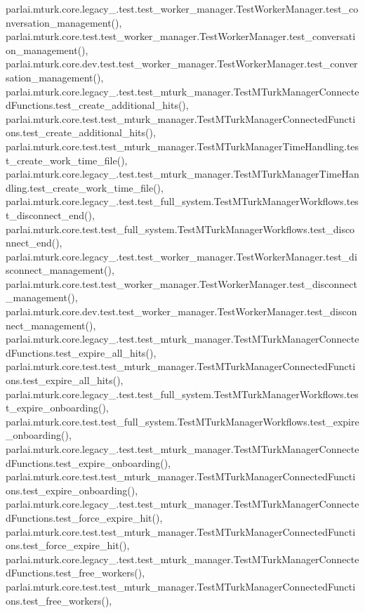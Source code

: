 parlai.\+mturk.\+core.\+legacy\+\_.\+test.\+test\+\_\+worker\+\_\+manager.\+Test\+Worker\+Manager.\+test\+\_\+conversation\+\_\+management(), parlai.\+mturk.\+core.\+test.\+test\+\_\+worker\+\_\+manager.\+Test\+Worker\+Manager.\+test\+\_\+conversation\+\_\+management(), parlai.\+mturk.\+core.\+dev.\+test.\+test\+\_\+worker\+\_\+manager.\+Test\+Worker\+Manager.\+test\+\_\+conversation\+\_\+management(), parlai.\+mturk.\+core.\+legacy\+\_.\+test.\+test\+\_\+mturk\+\_\+manager.\+Test\+M\+Turk\+Manager\+Connected\+Functions.\+test\+\_\+create\+\_\+additional\+\_\+hits(), parlai.\+mturk.\+core.\+test.\+test\+\_\+mturk\+\_\+manager.\+Test\+M\+Turk\+Manager\+Connected\+Functions.\+test\+\_\+create\+\_\+additional\+\_\+hits(), parlai.\+mturk.\+core.\+test.\+test\+\_\+mturk\+\_\+manager.\+Test\+M\+Turk\+Manager\+Time\+Handling.\+test\+\_\+create\+\_\+work\+\_\+time\+\_\+file(), parlai.\+mturk.\+core.\+legacy\+\_.\+test.\+test\+\_\+mturk\+\_\+manager.\+Test\+M\+Turk\+Manager\+Time\+Handling.\+test\+\_\+create\+\_\+work\+\_\+time\+\_\+file(), parlai.\+mturk.\+core.\+legacy\+\_.\+test.\+test\+\_\+full\+\_\+system.\+Test\+M\+Turk\+Manager\+Workflows.\+test\+\_\+disconnect\+\_\+end(), parlai.\+mturk.\+core.\+test.\+test\+\_\+full\+\_\+system.\+Test\+M\+Turk\+Manager\+Workflows.\+test\+\_\+disconnect\+\_\+end(), parlai.\+mturk.\+core.\+legacy\+\_.\+test.\+test\+\_\+worker\+\_\+manager.\+Test\+Worker\+Manager.\+test\+\_\+disconnect\+\_\+management(), parlai.\+mturk.\+core.\+test.\+test\+\_\+worker\+\_\+manager.\+Test\+Worker\+Manager.\+test\+\_\+disconnect\+\_\+management(), parlai.\+mturk.\+core.\+dev.\+test.\+test\+\_\+worker\+\_\+manager.\+Test\+Worker\+Manager.\+test\+\_\+disconnect\+\_\+management(), parlai.\+mturk.\+core.\+legacy\+\_.\+test.\+test\+\_\+mturk\+\_\+manager.\+Test\+M\+Turk\+Manager\+Connected\+Functions.\+test\+\_\+expire\+\_\+all\+\_\+hits(), parlai.\+mturk.\+core.\+test.\+test\+\_\+mturk\+\_\+manager.\+Test\+M\+Turk\+Manager\+Connected\+Functions.\+test\+\_\+expire\+\_\+all\+\_\+hits(), parlai.\+mturk.\+core.\+legacy\+\_.\+test.\+test\+\_\+full\+\_\+system.\+Test\+M\+Turk\+Manager\+Workflows.\+test\+\_\+expire\+\_\+onboarding(), parlai.\+mturk.\+core.\+test.\+test\+\_\+full\+\_\+system.\+Test\+M\+Turk\+Manager\+Workflows.\+test\+\_\+expire\+\_\+onboarding(), parlai.\+mturk.\+core.\+legacy\+\_.\+test.\+test\+\_\+mturk\+\_\+manager.\+Test\+M\+Turk\+Manager\+Connected\+Functions.\+test\+\_\+expire\+\_\+onboarding(), parlai.\+mturk.\+core.\+test.\+test\+\_\+mturk\+\_\+manager.\+Test\+M\+Turk\+Manager\+Connected\+Functions.\+test\+\_\+expire\+\_\+onboarding(), parlai.\+mturk.\+core.\+legacy\+\_.\+test.\+test\+\_\+mturk\+\_\+manager.\+Test\+M\+Turk\+Manager\+Connected\+Functions.\+test\+\_\+force\+\_\+expire\+\_\+hit(), parlai.\+mturk.\+core.\+test.\+test\+\_\+mturk\+\_\+manager.\+Test\+M\+Turk\+Manager\+Connected\+Functions.\+test\+\_\+force\+\_\+expire\+\_\+hit(), parlai.\+mturk.\+core.\+legacy\+\_.\+test.\+test\+\_\+mturk\+\_\+manager.\+Test\+M\+Turk\+Manager\+Connected\+Functions.\+test\+\_\+free\+\_\+workers(), parlai.\+mturk.\+core.\+test.\+test\+\_\+mturk\+\_\+manager.\+Test\+M\+Turk\+Manager\+Connected\+Functions.\+test\+\_\+free\+\_\+workers(), 